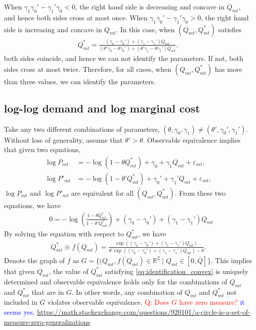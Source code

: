 \documentclass[11pt, a4paper]{article}
\numberwithin{figure}{section}
\theoremstyle{definition}
\newcommand{\0}{\mathbf{0}}
\begin{document}
When $\gamma_1\gamma_0' - \gamma_1' \gamma_0 < 0$, the right hand side is decreasing and concave in $Q_{mt}$, and hence both sides cross at most once.
When $\gamma_1\gamma_0' - \gamma_1' \gamma_0 >0$, the right hand side is increasing and concave in $Q_{mt}$.
In this case, when $(Q_{mt}, Q^*_{mt})$ satisfies
\begin{align*}
    Q^*_{mt} = \frac{(\gamma_0 - \gamma_0') + (\gamma_1 - \gamma_1')Q_{mt}}{(\theta'\gamma_0 - \theta\gamma_0') + (\theta'\gamma_1 - \theta\gamma_1')Q_{mt}},
\end{align*}
both sides coincide, and hence we can not identify the parameters. If not, both sides cross at most twice.
Therefore, for all cases, when $(Q_{mt}, Q^*_{mt})$ has more than three values, we can identify the parameters.

\subsection{log-log demand and log marginal cost}
    Take any two different combinations of parameters, $(\theta, \gamma_0, \gamma_1) \ne (\theta', \gamma_0', \gamma_1')$. Without loss of generality, assume that $\theta' > \theta$. Observable equivalence implies that given two equations,
    \begin{align}
        \log P_{mt} &= -\log \left(  1 - \theta Q^*_{mt} \right) +\gamma_0 + \gamma_1 Q_{mt} + \varepsilon_{mt},\\
        \log P'_{mt} &= -\log \left(  1 - \theta' Q^*_{mt} \right) +\gamma_0' + \gamma_1' Q_{mt} + \varepsilon_{mt},
    \end{align}
    $\log P_{mt}$ and $\log P'_{mt}$ are equivalent for all $(Q_{mt}, Q^*_{mt})$.
    From these two equations, we have
    \begin{align}\label{eq:identification_convex}
        &0  = -\log \left( \frac{ 1 - \theta Q^*_{mt}}{ 1 - \theta' Q^*_{mt}} \right) +(\gamma_0 -\gamma_0') + (\gamma_1 - \gamma_1') Q_{mt}
    \end{align}
    By solving the equation with respect to $Q^*_{mt}$, we have
    \begin{align*}
        Q^*_{mt} \equiv f(Q_{mt}) = \frac{\exp((\gamma_0 -\gamma_0') + (\gamma_1 - \gamma_1') Q_{mt})}{\theta'\exp((\gamma_0 -\gamma_0') + (\gamma_1 - \gamma_1') Q_{mt}) - \theta }.
    \end{align*}
    Denote the graph of $f$ as $G = \{ (Q_{mt}, f(Q_{mt}) \in \mathbb{R}^2 \mid Q_{mt} \in [0,\bar{Q}] \}$.
    This implies that given $Q_{mt}$, the value of $ Q^*_{mt}$ satisfying \eqref{eq:identification_convex} is uniquely determined and observable equivalence holds only for the combinations of $Q_{mt}$ and $Q^*_{mt}$ that are in $G$. In other words, any combination of $Q_{mt}$ and $Q^*_{mt}$ not included in $G$ violates observable equivalence.
    \textcolor{red}{Q: Does $ G$ have zero measure?} \textcolor{blue}{it seems yes. \url{ https://math.stackexchange.com/questions/920101/a-circle-is-a-set-of-measure-zero-generalizations}}
    
\end{document}
